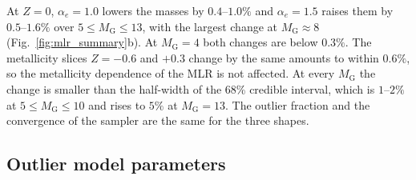 \documentclass{aa}
\begin{document}
\begin{appendix}
At $Z=0$, $\alpha_e=1.0$ lowers the masses by $0.4$--$1.0\%$ and $\alpha_e=1.5$ raises them by $0.5$--$1.6\%$ over $5\le M_{\mathrm{G}}\le13$, with the largest change at $M_{\mathrm{G}}\approx8$ (Fig.~\ref{fig:mlr_summary}b). At $M_{\mathrm{G}}=4$ both changes are below $0.3\%$. The metallicity slices $Z=-0.6$ and $+0.3$ change by the same amounts to within $0.6\%$, so the metallicity dependence of the MLR is not affected. At every $M_{\mathrm{G}}$ the change is smaller than the half-width of the 68\% credible interval, which is $1$--$2\%$ at $5\le M_{\mathrm{G}}\le10$ and rises to $5\%$ at $M_{\mathrm{G}}=13$. The outlier fraction and the convergence of the sampler are the same for the three shapes.

\subsection{Outlier model parameters}\label{sec:outlier_params}

\end{appendix}
\end{document}

